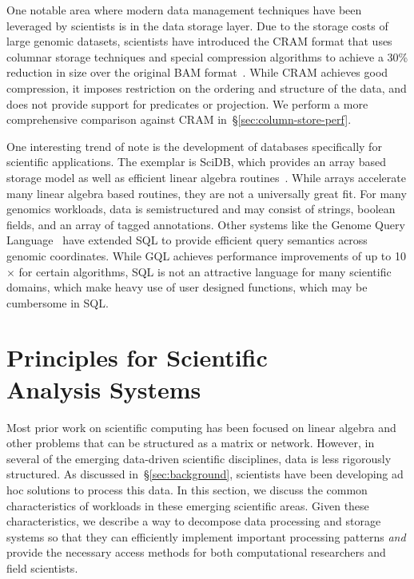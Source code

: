 \documentclass{acm_proc_article-sp}
\begin{document}
One notable area where modern data management techniques have been leveraged by scientists is in
the data storage layer. Due to the storage costs of large genomic datasets, scientists have introduced the
CRAM format that uses columnar storage techniques and special compression algorithms to achieve a
30\% reduction in size over the original BAM format~\cite{fritz11}. While CRAM achieves good
compression, it imposes restriction on the ordering and structure of the data, and does not provide
support for predicates or projection. We perform a more comprehensive comparison against CRAM
in~\S\ref{sec:column-store-perf}.

One interesting trend of note is the development of databases specifically for scientific applications.
The exemplar is \linebreak SciDB, which provides an array based storage model as well as efficient
linear algebra routines~\cite{brown10}. While arrays accelerate many linear algebra based routines, they
are not a universally great fit. For many genomics workloads, data is semistructured and may consist of
strings, boolean fields, and an array of tagged annotations. Other systems like the Genome Query
Language~\cite{kozanitis14} have extended SQL to provide efficient query semantics across genomic
coordinates. While GQL achieves performance improvements of up to 10$\times$ for certain algorithms,
SQL is not an attractive language for many scientific domains, which make heavy use of user designed
functions, which may be cumbersome in SQL.

\section{Principles for Scientific \\ Analysis Systems}
\label{sec:principles}

Most prior work on scientific computing has been focused on linear algebra and other problems that can
be structured as a matrix or network. However, in several of the emerging data-driven scientific
disciplines, data is less rigorously structured. As discussed
in~\S\ref{sec:background}, scientists have been developing ad hoc solutions to process this data. In this
section, we discuss the common characteristics of workloads in these emerging scientific areas. Given
these characteristics, we describe a way to decompose data processing and storage systems so that
they can efficiently implement important processing patterns \emph{and} provide the necessary access
methods for both computational researchers and field scientists.
\end{document}
